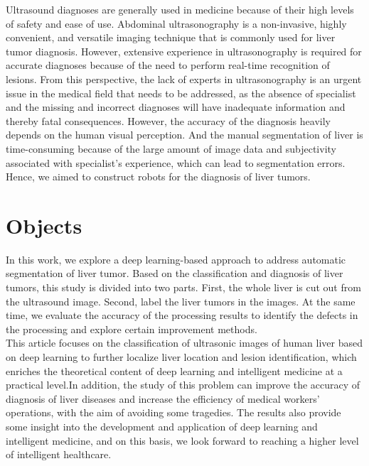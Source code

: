 \documentclass[12pt, a4paper]{article}
\begin{document}
\setlength{\parindent}{1em}
Ultrasound diagnoses are generally used in medicine because of their high levels of safety and ease of use\cite{r8}. Abdominal ultrasonography is a non-invasive, highly convenient, and versatile imaging technique that is commonly used for liver tumor diagnosis. However, extensive experience in ultrasonography is required for accurate diagnoses because of the need to perform real-time recognition of lesions. From this perspective, the lack of experts in ultrasonography is an urgent issue in the medical field that needs to be addressed, as the absence of specialist and the missing and incorrect diagnoses will have inadequate information and thereby fatal consequences. However, the accuracy of the diagnosis heavily depends on the human visual perception. And the manual segmentation of liver is time-consuming because of the large amount of image data and subjectivity associated with specialist’s experience, which can lead to segmentation errors. Hence, we aimed to construct robots for the diagnosis of liver tumors.\\



\section{Objects} 

\setlength{\parindent}{1em}
In this work, we explore a deep learning-based approach to address automatic segmentation of liver tumor. Based on the classification and diagnosis of liver tumors, this study is divided into two parts. First, the whole liver is cut out from the ultrasound image. Second, label the liver tumors in the images. At the same time, we evaluate the accuracy of the processing results to identify the defects in the processing and explore certain improvement methods.\\

\setlength{\parindent}{1em}
This article focuses on the classification of ultrasonic images of human liver based on deep learning to further localize liver location and lesion identification, which enriches the theoretical content of deep learning and intelligent medicine at a practical level.In addition, the study of this problem can improve the accuracy of diagnosis of liver diseases and increase the efficiency of medical workers' operations, with the aim of avoiding some tragedies. The results also provide some insight into the development and application of deep learning and intelligent medicine, and on this basis, we look forward to reaching a higher level of intelligent healthcare.
\end{document}
